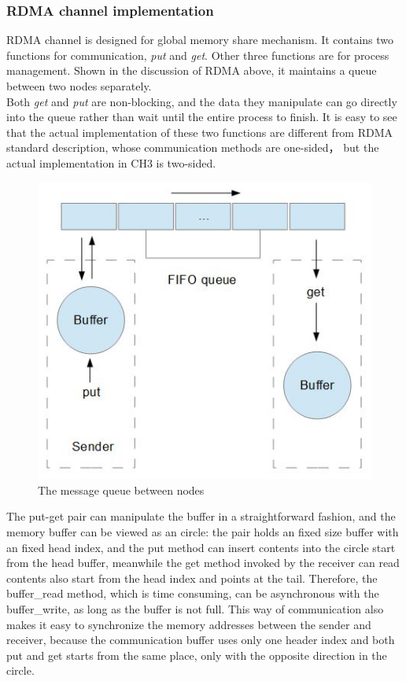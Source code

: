 \documentclass[11pt,openright,a4paper]{report}
\begin{document}
\subsubsection{RDMA channel implementation}
RDMA channel is designed for global memory share mechanism. It contains two functions for communication, \textit{put} and \textit{get}. Other three functions are for process management. Shown in the discussion of RDMA above, it maintains a queue between two nodes separately.\\
Both \textit{get} and \textit{put} are non-blocking, and the data they manipulate can go directly into the queue rather than wait until the entire process to finish. It is easy to see that the actual implementation of these two functions are different from RDMA standard description, whose communication methods are one-sided， but the actual implementation in CH3 is two-sided.\\
\begin{figure}[H]
	\centering
	\includegraphics[width=0.5\linewidth]{picture/senderreceiver}
	\caption{The message queue between nodes}
	\label{fig:senderreceiver}
\end{figure}
The put-get pair can manipulate the buffer in a straightforward fashion, and the memory buffer can be viewed as an circle: the pair holds an fixed size buffer with an fixed head index, and the put method can insert contents into the circle start from the head buffer, meanwhile the get method invoked by the receiver can read contents also start from the head index and points at the tail. Therefore, the buffer\_read method, which is time consuming, can be asynchronous with the buffer\_write, as long as the buffer is not full. This way of communication also makes it easy to synchronize the memory addresses between the sender and receiver, because the communication buffer uses only one header index and both put and get starts from the same place, only with the opposite direction in the circle.\\
\end{document}

